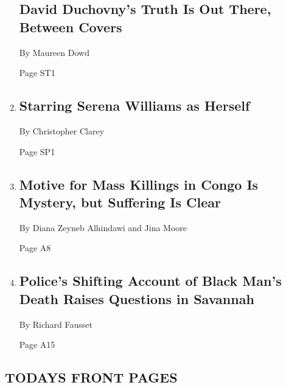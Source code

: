 \begin{enumerate}
  \hypertarget{david-duchovnys-truth-is-out-there-between-covers}{%
  \subsection{David Duchovny's Truth Is Out There, Between
  Covers}\label{david-duchovnys-truth-is-out-there-between-covers}}

  By Maureen Dowd

  Page ST1
\item
  \href{/2018/04/27/sports/tennis/serena-williams.html}{}

  \hypertarget{starring-serena-williams-as-herself}{%
  \subsection{Starring Serena Williams as
  Herself}\label{starring-serena-williams-as-herself}}

  By Christopher Clarey

  Page SP1
\item
  \href{/2018/04/28/world/africa/congo-ituri-joseph-kabila.html}{}

  \hypertarget{motive-for-mass-killings-in-congo-is-mystery-but-suffering-is-clear}{%
  \subsection{Motive for Mass Killings in Congo Is Mystery, but
  Suffering Is
  Clear}\label{motive-for-mass-killings-in-congo-is-mystery-but-suffering-is-clear}}

  By Diana Zeyneb Alhindawi and Jina Moore

  Page A8
\item
  \href{/2018/04/28/us/polices-shifting-account-of-black-mans-death-raises-questions-in-savannah.html}{}

  \hypertarget{polices-shifting-account-of-black-mans-death-raises-questions-in-savannah}{%
  \subsection{Police's Shifting Account of Black Man's Death Raises
  Questions in
  Savannah}\label{polices-shifting-account-of-black-mans-death-raises-questions-in-savannah}}

  By Richard Fausset

  Page A15
\end{enumerate}

\hypertarget{todays-front-pages}{%
\subsection{TODAYS FRONT PAGES}\label{todays-front-pages}}

